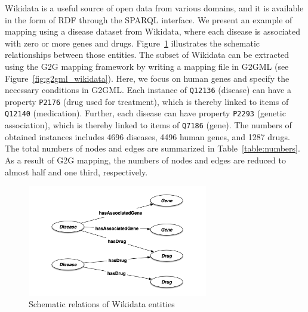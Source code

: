 \documentclass[runningheads]{llncs}
\begin{document}
Wikidata is a useful source of open data from various domains, and it is available in the form of RDF through the SPARQL interface.
We present an example of mapping using a disease dataset from Wikidata, 
where each disease is associated with zero or more genes and drugs.
Figure~\ref{fig:wikidata_schema.png} illustrates the schematic relationships between those entities. 
The subset of Wikidata can be extracted using the G2G mapping framework by writing a mapping file in G2GML (see Figure~\ref{fig:g2gml_wikidata}).
Here, we focus on human genes and specify the necessary conditions in G2GML.
Each instance of \texttt{Q12136} (disease) can have a property \texttt{P2176} (drug used for treatment), which is thereby linked to items of \texttt{Q12140} (medication). Further, each disease can have property \texttt{P2293} (genetic association), which is thereby linked to items of \texttt{Q7186} (gene).
The numbers of obtained instances includes 4696 diseases, 4496 human genes, and 1287 drugs. The total numbers of nodes and edges are summarized in Table~\ref{table:numbers}. As a result of G2G mapping, the numbers of nodes and edges are reduced to almost half and one third, respectively.
 
\begin{figure}
\center
\includegraphics[width=0.7\textwidth]{wikidata_schema.png}
\caption{Schematic relations of Wikidata entities}
\label{fig:wikidata_schema.png}
\end{figure}
 
\end{document}
